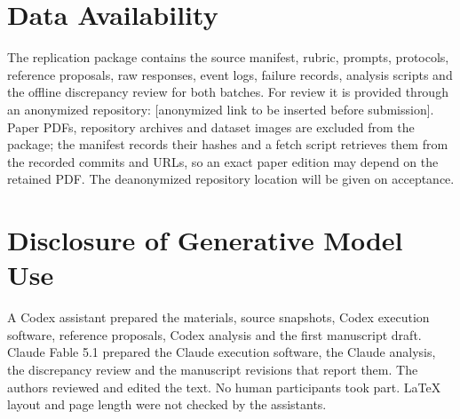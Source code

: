 \documentclass[10pt,conference]{IEEEtran}
\begin{document}
\section*{Data Availability}
The replication package contains the source manifest, rubric, prompts, protocols, reference proposals, raw responses, event logs, failure records, analysis scripts and the offline discrepancy review for both batches. For review it is provided through an anonymized repository: [anonymized link to be inserted before submission]. Paper PDFs, repository archives and dataset images are excluded from the package; the manifest records their hashes and a fetch script retrieves them from the recorded commits and URLs, so an exact paper edition may depend on the retained PDF. The deanonymized repository location will be given on acceptance.

\section*{Disclosure of Generative Model Use}
A Codex assistant prepared the materials, source snapshots, Codex execution software, reference proposals, Codex analysis and the first manuscript draft. Claude Fable 5.1 prepared the Claude execution software, the Claude analysis, the discrepancy review and the manuscript revisions that report them. The authors reviewed and edited the text. No human participants took part. LaTeX layout and page length were not checked by the assistants.


\end{document}
